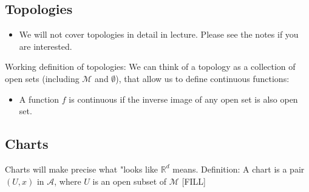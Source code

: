 \documentclass[10pt]{article}
\begin{document}
\subsection*{Topologies}
\begin{itemize}
    \item We will not cover topologies in detail in lecture.  Please see the notes if you are interested.
\end{itemize}
Working definition of topologies:  We can think of a topology as a collection of open sets (including $\mathcal{M}$ and $\emptyset$), that allow us to define continuous functions:
\begin{itemize}
    \item A function $f$ is continuous if the inverse image of any open set is also open set.
\end{itemize}

\subsection*{Charts}
Charts will make precise what "looks like $\mathbb{R}^d$ means.
Definition: A chart is a pair $(U, x)$ in $\mathcal{A}$, where $U$ is an open subset of $\mathcal{M}$
[FILL]
\end{document}
